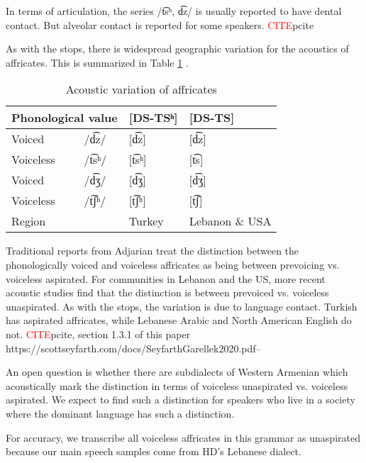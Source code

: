 	In terms of articulation, the series /t͡sʰ, d͡z/ is usually reported to have dental contact. But alveolar contact is reported for some speakers. \textcolor{red}{CITE}p{cite}
	
	As with the stops, there is widespread geographic variation for the acoustics of affricates. This is summarized in Table \ref{tab:affr acoustic variation} . 
	
	
	\begin{table}[H]
  \centering
  \caption{Acoustic variation of affricates}
  \label{tab:affr acoustic variation}
  \begin{tabular}{|ll|ll|}
  	\hline 
  	\multicolumn{2}{|l|}{Phonological value} & [DS-TSʰ] & [DS-TS] \\
  	\hline 
  	Voiced & /d͡z/ & [d͡z] & [d͡z]
  	\\
  	Voiceless & /t͡sʰ/ & [t͡sʰ] & [t͡s] 
  	\\
  	\hline 
  	Voiced & /d͡ʒ/ & [d͡ʒ] & [d͡ʒ]
  	\\
  	Voiceless & /t͡ʃʰ/ & [t͡ʃʰ] & [t͡ʃ] 
  	\\
  	\hline
  	Region & & Turkey & Lebanon \& USA
  	\\
  	\hline\end{tabular}
  
	\end{table} 
	
	
	
	Traditional reports from Adjarian treat the distinction between the phonologically voiced and voiceless affricates as being between prevoicing vs. voiceless aspirated. For communities in Lebanon and the US, more recent acoustic studies find that the distinction is between prevoiced vs. voiceless unaspirated. As with the stops, the variation is due to language contact. Turkish has aspirated affricates, while Lebanese Arabic and North American English do not. \textcolor{red}{CITE}p{cite, section 1.3.1 of this paper https://scottseyfarth.com/docs/SeyfarthGarellek2020.pdf--}
	
	An open question is whether there are subdialects of Western Armenian which acoustically mark the distinction in terms of voiceless unaspirated vs. voiceless aspirated. We expect to find such a distinction for speakers who live in a society where the dominant language has such a distinction. 
	
	For accuracy, we transcribe all voiceless affricates in this grammar as unaspirated because our main speech samples come from HD's Lebanese dialect. 
	
